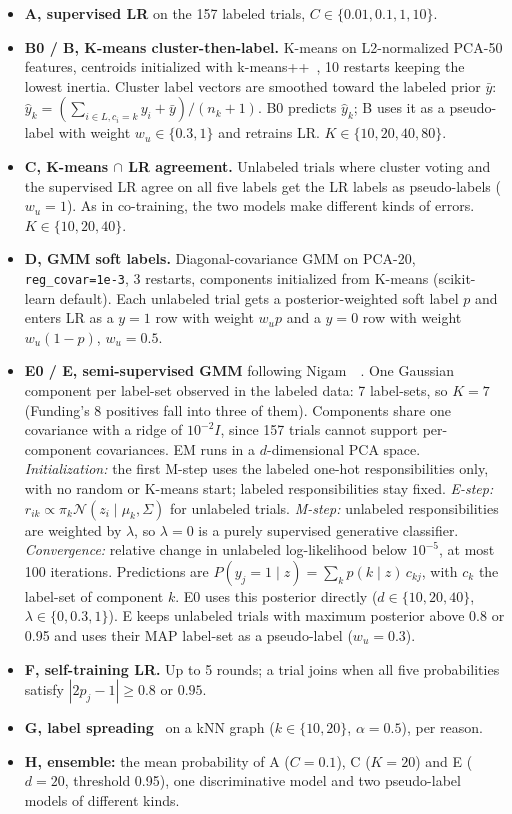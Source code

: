 \begin{itemize}[leftmargin=*,itemsep=1pt,topsep=2pt]
\item \textbf{A, supervised LR} on the 157 labeled trials, $C\in\{0.01,0.1,1,10\}$.
\item \textbf{B0 / B, K-means cluster-then-label.}
K-means on L2-normalized PCA-50 features, centroids initialized with k-means++~\cite{arthur2007kmeans}, 10 restarts keeping the lowest inertia.
Cluster label vectors are smoothed toward the labeled prior $\bar y$: $\hat y_k=(\sum_{i\in L,c_i=k}y_i+\bar y)/(n_k+1)$.
B0 predicts $\hat y_k$; B uses it as a pseudo-label with weight $w_u\in\{0.3,1\}$ and retrains LR. $K\in\{10,20,40,80\}$.
\item \textbf{C, K-means $\cap$ LR agreement.}
Unlabeled trials where cluster voting and the supervised LR agree on all five labels get the LR labels as pseudo-labels ($w_u=1$).
As in co-training, the two models make different kinds of errors. $K\in\{10,20,40\}$.
\item \textbf{D, GMM soft labels.}
Diagonal-covariance GMM on PCA-20, \texttt{reg\_covar=1e-3}, 3 restarts, components initialized from K-means (scikit-learn default).
Each unlabeled trial gets a posterior-weighted soft label $p$ and enters LR as a $y=1$ row with weight $w_u p$ and a $y=0$ row with weight $w_u(1-p)$, $w_u=0.5$.
\item \textbf{E0 / E, semi-supervised GMM} following Nigam~\etal~\cite{nigam2000text}.
One Gaussian component per label-set observed in the labeled data: 7 label-sets, so $K=7$ (Funding's 8 positives fall into three of them).
Components share one covariance with a ridge of $10^{-2}I$, since 157 trials cannot support per-component covariances.
EM runs in a $d$-dimensional PCA space.
\emph{Initialization:} the first M-step uses the labeled one-hot responsibilities only, with no random or K-means start; labeled responsibilities stay fixed.
\emph{E-step:} $r_{ik}\propto\pi_k\mathcal N(z_i\mid\mu_k,\Sigma)$ for unlabeled trials.
\emph{M-step:} unlabeled responsibilities are weighted by $\lambda$, so $\lambda=0$ is a purely supervised generative classifier.
\emph{Convergence:} relative change in unlabeled log-likelihood below $10^{-5}$, at most 100 iterations.
Predictions are $P(y_j=1\mid z)=\sum_k p(k\mid z)\,c_{kj}$, with $c_k$ the label-set of component $k$.
E0 uses this posterior directly ($d\in\{10,20,40\}$, $\lambda\in\{0,0.3,1\}$).
E keeps unlabeled trials with maximum posterior above 0.8 or 0.95 and uses their MAP label-set as a pseudo-label ($w_u=0.3$).
\item \textbf{F, self-training LR.} Up to 5 rounds; a trial joins when all five probabilities satisfy $|2p_j-1|\ge 0.8$ or $0.95$.
\item \textbf{G, label spreading}~\cite{zhou2004learning} on a kNN graph ($k\in\{10,20\}$, $\alpha=0.5$), per reason.
\item \textbf{H, ensemble:} the mean probability of A ($C=0.1$), C ($K=20$) and E ($d=20$, threshold 0.95), one discriminative model and two pseudo-label models of different kinds.
\end{itemize}

